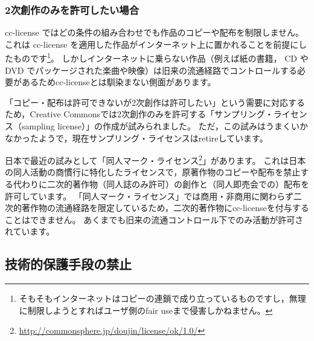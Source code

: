 \documentclass{ltjsarticle}
\begin{document}
\subsubsection{2次創作のみを許可したい場合}

cc-license ではどの条件の組み合わせでも作品のコピーや配布を制限しません。
これは cc-license を適用した作品がインターネット上に置かれることを前提にしたものです\footnote{そもそもインターネットはコピーの連鎖で成り立っているものですし，無理に制限しようとすればユーザ側のfair useまで侵害しかねません。}。
しかしインターネットに乗らない作品（例えば紙の書籍， CD や DVD でパッケージされた楽曲や映像）は旧来の流通経路でコントロールする必要があるためcc-licenseとは馴染まない側面があります。

「コピー・配布は許可できないが2次創作は許可したい」という需要に対応するため，Creative Commonsでは2次創作のみを許可する「サンプリング・ライセンス（sampling license）」の作成が試みられました。
ただ，この試みはうまくいかなかったようで，現在サンプリング・ライセンスはretireしています。

日本で最近の試みとして「同人マーク・ライセンス\footnote{\url{http://commonsphere.jp/doujin/license/ok/1.0/}}」があります。
これは日本の同人活動の商慣行に特化したライセンスで，原著作物のコピーや配布を禁止する代わりに二次的著作物（同人誌のみ許可）の創作と（同人即売会での）配布を許可しています。
「同人マーク・ライセンス」では商用・非商用に関わらず二次的著作物の流通経路を限定しているため，二次的著作物にcc-licenseを付与することはできません。
あくまでも旧来の流通コントロール下でのみ活動が許可されています。


\subsection{技術的保護手段の禁止} \label{sec:drm}
\end{document}
